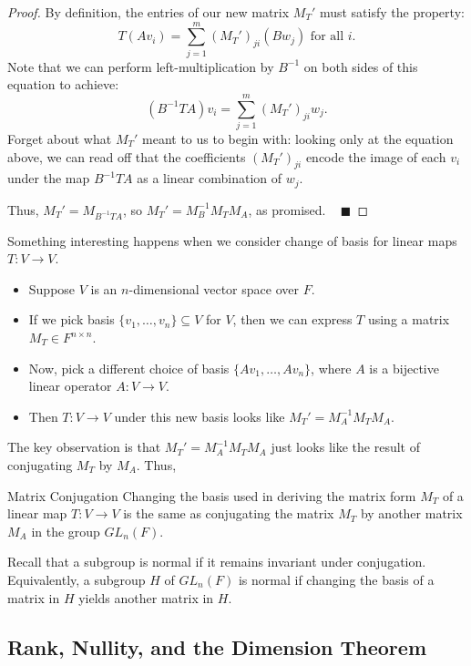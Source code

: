 \begin{proof}
    By definition, the entries of our new matrix $M_T'$ must satisfy the property:
    \[ T(Av_i) = \sum_{j = 1}^m (M_T')_{ji} (Bw_j) \text{ for all } i. \]
    Note that we can perform left-multiplication by $B^{-1}$ on both sides of this equation to achieve:
    \[ (B^{-1}TA)v_i = \sum_{j = 1}^m (M_T')_{ji}w_j. \]
    Forget about what $M_T'$ meant to us to begin with: looking only at the equation above, we can read off that the coefficients $(M_T')_{ji}$ encode the image of each $v_i$ under the map $B^{-1}TA$ as a linear combination of $w_j$.
    
    Thus, $M_T' = M_{B^{-1}TA}$, so $M_T' = M_B^{-1} M_TM_A$, as promised. ~ $\blacksquare$
\end{proof}

Something interesting happens when we consider change of basis for linear maps $T: V \to V$.
\begin{itemize}
    \item Suppose $V$ is an $n$-dimensional vector space over $F$.
    \item If we pick basis $\{v_1, \dots, v_n\} \subseteq V$ for $V$, then we can express $T$ using a matrix $M_T \in F^{n \times n}$.
    \item Now, pick a different choice of basis $\{Av_1, \dots, Av_n\}$, where $A$ is a bijective linear operator $A: V \to V$.
    \item Then $T: V \to V$ under this new basis looks like $M_T' = M_A^{-1}M_TM_A$.
\end{itemize}
The key observation is that $M_T' = M_A^{-1}M_TM_A$ just looks like the result of conjugating $M_T$ by $M_A$.  Thus,

\begin{theorem}{Matrix Conjugation}
    Changing the basis used in deriving the matrix form $M_T$ of a linear map $T: V \to V$ is the same as conjugating the matrix $M_T$ by another matrix $M_A$ in the group $GL_n(F)$.
\end{theorem}

\begin{remark}
    Recall that a subgroup is normal if it remains invariant under conjugation.  Equivalently, a subgroup $H$ of $GL_n(F)$ is normal if changing the basis of a matrix in $H$ yields another matrix in $H$.
\end{remark}


\subsection{Rank, Nullity, and the Dimension Theorem}

